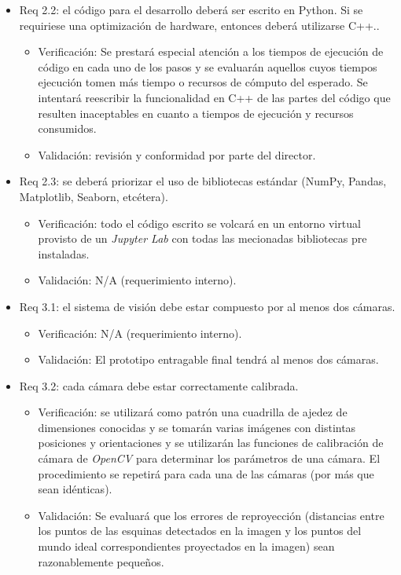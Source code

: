 \documentclass[
11pt, %
]{charter}
\begin{document}
\begin{itemize}
\item Req 2.2: el código para el desarrollo deberá ser escrito en Python. Si se requiriese una optimización de hardware, entonces deberá utilizarse C++..
\begin{itemize}
	\item Verificación: Se prestará especial atención a los tiempos de ejecución de código en cada uno de los pasos y se evaluarán aquellos cuyos tiempos ejecución tomen más tiempo o recursos de cómputo del esperado. Se intentará reescribir la funcionalidad en C++ de las partes del código que resulten inaceptables en cuanto a tiempos de ejecución y recursos consumidos.
	\item Validación: revisión y conformidad por parte del director.
\end{itemize}

\item Req 2.3: se deberá priorizar el uso de bibliotecas estándar (NumPy, Pandas, Matplotlib, Seaborn,
etcétera).
\begin{itemize}
	\item Verificación: todo el código escrito se volcará en un entorno virtual provisto de un \emph{Jupyter Lab} con todas las mecionadas bibliotecas pre instaladas.
	\item Validación: N/A (requerimiento interno).
\end{itemize}



\item Req 3.1: el sistema de visión debe estar compuesto por al menos dos cámaras.
\begin{itemize}
	\item Verificación: N/A (requerimiento interno).
	\item Validación: El prototipo entragable final tendrá al menos dos cámaras.
\end{itemize}

\item Req 3.2: cada cámara debe estar correctamente calibrada.
\begin{itemize}
	\item Verificación: se utilizará como patrón una cuadrilla de ajedez de dimensiones conocidas y se tomarán varias imágenes con distintas posiciones y orientaciones y se utilizarán las funciones de calibración de cámara de \emph{OpenCV} para determinar los parámetros de una cámara. El procedimiento se repetirá para cada una de las cámaras (por más que sean idénticas).
	\item Validación: Se evaluará que los errores de reproyección (distancias entre los puntos de las esquinas detectados en la imagen y los puntos del mundo ideal correspondientes proyectados en la imagen) sean razonablemente pequeños.
\end{itemize}


\end{itemize}
\end{document}
